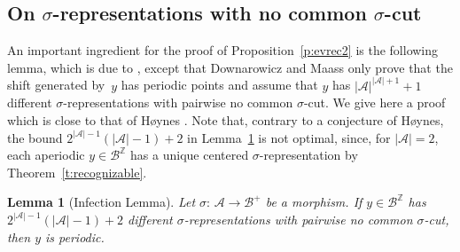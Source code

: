 \documentclass{amsart}
\newtheorem{lemma}{Lemma}[section]
\theoremstyle{definition}
\theoremstyle{remark}
\numberwithin{equation}{section}
\begin{document}
\subsection{On $\sigma$-representations with no common $\sigma$-cut}\label{sec:nocu}
An important ingredient for the proof of Proposition~\ref{p:evrec2} is the following lemma, which is due to \cite{Down:2008}, except that Downarowicz and Maass only prove that the shift generated by~$y$ has periodic points and assume that $y$ has $|\mathcal{A}|^{|\mathcal{A}|+1}+1$ different $\sigma$-representations with pairwise no common $\sigma$-cut.
We give here a proof which is close to that of H{\o}ynes \cite{Hoynes:2017}.
Note that, contrary to a conjecture of H{\o}ynes, the bound $2^{|\mathcal{A}|-1} (|\mathcal{A}|-1) + 2$ in Lemma~\ref{l:infection} is not optimal, since, for $|\mathcal{A}| = 2$, each aperiodic $y \in \mathcal{B}^\mathbb{Z}$ has a unique centered $\sigma$-representation by Theorem~\ref{t:recognizable}.

\begin{lemma}[Infection Lemma] \label{l:infection}
Let $\sigma:\, \mathcal{A} \to \mathcal{B}^+$ be a morphism. 
If $y \in \mathcal{B}^\mathbb{Z}$ has $2^{|\mathcal{A}|-1} (|\mathcal{A}|-1) + 2$ different $\sigma$-representations with pairwise no common $\sigma$-cut, then $y$ is periodic. 
\end{lemma}
\end{document}

